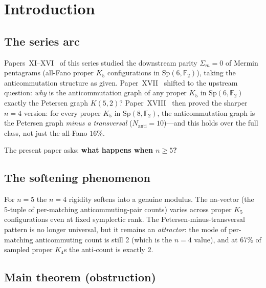 \documentclass[11pt,a4paper]{article}
\theoremstyle{remark}
\newcommand{\Sp}{\mathrm{Sp}}
\newcommand{\Nanti}{N_{\mathrm{anti}}}
\begin{document}
\section{Introduction}\label{sec:intro}

\subsection*{The series arc}

Papers~XI--XVI~\cite{PaperXI,PaperXII,PaperXIII,PaperXIV,PaperXV,PaperXVI}
of this series studied the downstream parity $\Sigma_m=0$ of Mermin
pentagrams (all-Fano proper $K_5$ configurations in $\Sp(6,\mathbb F_2)$), taking the
anticommutation structure as given.  Paper~XVII~\cite{PaperXVII} shifted to the upstream question:
\emph{why} is the anticommutation graph of any proper $K_5$ in $\Sp(6,\mathbb F_2)$
exactly the Petersen graph $K(5,2)$?  Paper~XVIII~\cite{PaperXVIII} then proved the sharper $n=4$ version:
for every proper $K_5$ in $\Sp(8,\mathbb F_2)$, the anticommutation graph is the
Petersen graph \emph{minus a transversal} ($\Nanti=10$)---and this holds over the
full class, not just the all-Fano $16\%$.

The present paper asks: \textbf{what happens when $n\ge5$?}

\subsection*{The softening phenomenon}

For $n=5$ the $n=4$ rigidity softens into a genuine modulus.
The na-vector (the 5-tuple of per-matching anticommuting-pair counts) varies across
proper $K_5$ configurations even at fixed symplectic rank.  The Petersen-minus-transversal
pattern is no longer universal, but it remains an \emph{attractor}: the mode of
per-matching anticommuting count is still 2 (which is the $n=4$ value), and at 67\%
of sampled proper $K_4$s the anti-count is exactly 2.

\subsection*{Main theorem (obstruction)}
\end{document}
